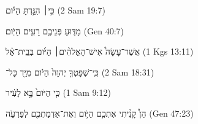 
\begin{exe}

\ex\label{ØH_sim_exs1}
\texthebrew{
כִּ֣י׀ הִגַּ֣דְתָּ הַיֹּ֗ום 
} (2 Sam 19:7)

\ex\label{ØH_sim_exs2}
\texthebrew{
מַדּ֛וּעַ פְּנֵיכֶ֥ם רָעִ֖ים הַיֹּֽום׃ 
} (Gen 40:7)

\ex\label{ØH_sim_exs3}
\texthebrew{
אֲשֶׁר־עָשָׂה֩ אִישׁ־הָאֱלֹהִ֨ים׀ הַיֹּ֜ום בְּבֵֽית־אֵ֗ל 
} (1 Kgs 13:11)

\ex\label{ØH_sim_exs4}
\texthebrew{
כִּֽי־שְׁפָטְךָ֤ יְהוָה֙ הַיֹּ֔ום מִיַּ֖ד כָּל־
} (2 Sam 18:31)

\ex\label{ØH_sim_exs5}
\texthebrew{
כִּ֤י הַיֹּום֙ בָּ֣א לָעִ֔יר 
} (1 Sam 9:12)

\ex\label{ØH_sim_exs6}
\texthebrew{
הֵן֩ קָנִ֨יתִי אֶתְכֶ֥ם הַיֹּ֛ום וְאֶת־אַדְמַתְכֶ֖ם לְפַרְעֹ֑ה 
} (Gen 47:23)

\end{exe}
